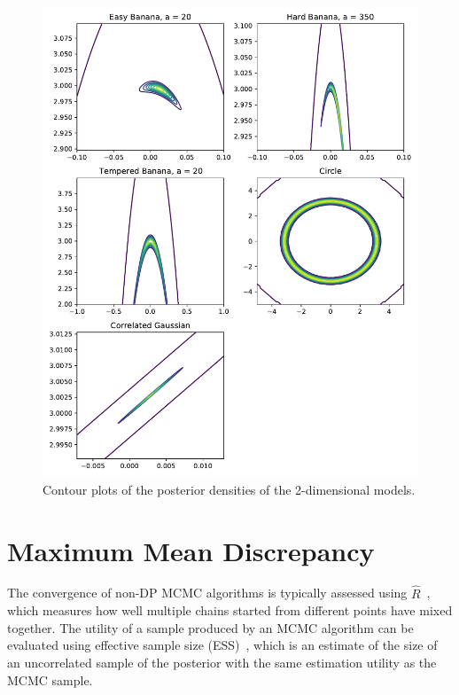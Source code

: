 \documentclass[english,twoside,openright]{HYgraduMLDS}
\begin{document}
\begin{figure}[h]
  \centering
  \includegraphics[width=\textwidth]{figures/posterior_plots}
  \caption{
    Contour plots of the posterior densities of the 2-dimensional models.
  }
  \label{posterior_plots_fig}
\end{figure}



\section{Maximum Mean Discrepancy}\label{mmd_section}

The convergence of non-DP MCMC algorithms is typically assessed using 
\(\hat{R}\)~\cite{BDA}, which measures how well multiple chains started from 
different points have mixed together. The utility of a sample produced by an 
MCMC algorithm can be evaluated using effective sample size (ESS)~\cite{BDA},
which is an estimate of the size of an uncorrelated sample of the posterior
with the same estimation utility as the MCMC sample. 
\end{document}
